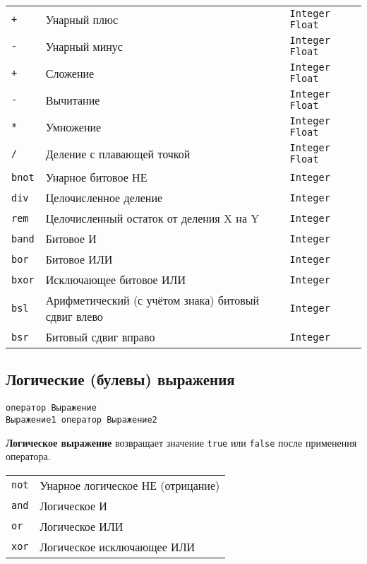 \begin{center}
\begin{tabular}{|>{\raggedright}p{35pt}|>{\raggedright}p{185pt}|>{\raggedright}p{128pt}|}
\hline
\multicolumn{3}{|p{309pt}|}{Арифметические операторы}\tabularnewline
\hline
\texttt{+}  & Унарный плюс  & \texttt{Integer} \textbar{} \texttt{Float} \tabularnewline
\hline
\texttt{-}  & Унарный минус  & \texttt{Integer} \textbar{} \texttt{Float} \tabularnewline
\hline
\texttt{+}  & Сложение & \texttt{Integer} \textbar{} \texttt{Float}\tabularnewline
\hline
\texttt{-}  & Вычитание & \texttt{Integer} \textbar{} \texttt{Float}\tabularnewline
\hline
\texttt{*}  & Умножение & \texttt{Integer} \textbar{} \texttt{Float}\tabularnewline
\hline
\texttt{/}  & Деление с плавающей точкой & \texttt{Integer} \textbar{} \texttt{Float}\tabularnewline
\hline
\texttt{bnot}  & Унарное битовое НЕ & \texttt{Integer} \tabularnewline
\hline
\texttt{div}  & Целочисленное деление & \texttt{Integer}\tabularnewline
\hline
\texttt{rem}  & Целочисленный остаток от деления X на Y  & \texttt{Integer} \tabularnewline
\hline
\texttt{band}  & Битовое И & \texttt{Integer}\tabularnewline
\hline
\texttt{bor}  & Битовое ИЛИ & \texttt{Integer} \tabularnewline
\hline
\texttt{bxor}  & Исключающее битовое ИЛИ & \texttt{Integer}\tabularnewline
\hline
\texttt{bsl}  & Арифметический (с учётом знака) битовый сдвиг влево & \texttt{Integer} \tabularnewline
\hline
\texttt{bsr}  & Битовый сдвиг вправо & \texttt{Integer}\tabularnewline
\hline
\end{tabular}
\end{center}



\subsection{Логические (булевы) выражения}

\begin{verbatim}
оператор Выражение
Выражение1 оператор Выражение2
\end{verbatim}

\textbf{Логическое выражение} возвращает значение \texttt{true} или \texttt{false}
после применения оператора.

\begin{center}
\begin{tabular}{|>{\raggedright}p{79pt}|>{\raggedright}p{241pt}|}
\hline
\multicolumn{2}{|p{321pt}|}{Логические (булевы) операторы}\tabularnewline
\hline
\texttt{not}  & Унарное логическое НЕ (отрицание) \tabularnewline
\hline
\texttt{and}  & Логическое И \tabularnewline
\hline
\texttt{or}  & Логическое ИЛИ \tabularnewline
\hline
\texttt{xor}  & Логическое исключающее ИЛИ \tabularnewline
\hline
\end{tabular}
\end{center}

